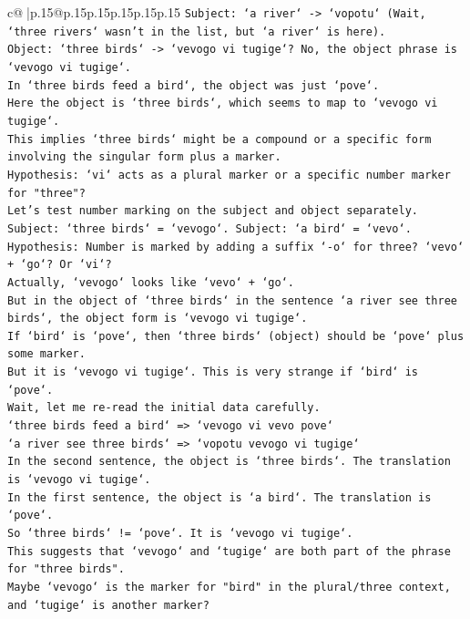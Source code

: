 \documentclass{article}
\begin{document}
{\begin{supertabular}{c@{$\;$}|p{.15\linewidth}@{}p{.15\linewidth}p{.15\linewidth}p{.15\linewidth}p{.15\linewidth}p{.15\linewidth}}
{{{\texttt{Subject: `a river` {-}> `vopotu` (Wait, `three rivers` wasn't in the list, but `a river` is here).} \\
\texttt{Object: `three birds` {-}> `vevogo vi tugige`? No, the object phrase is `vevogo vi tugige`.} \\
\texttt{In `three birds feed a bird`, the object was just `pove`.} \\
\texttt{Here the object is `three birds`, which seems to map to `vevogo vi tugige`.} \\
\texttt{This implies `three birds` might be a compound or a specific form involving the singular form plus a marker.} \\
\texttt{Hypothesis: `vi` acts as a plural marker or a specific number marker for "three"?} \\
\texttt{Let's test number marking on the subject and object separately.} \\
\texttt{Subject: `three birds` = `vevogo`. Subject: `a bird` = `vevo`.} \\
\texttt{Hypothesis: Number is marked by adding a suffix `{-}o` for three? `vevo` + `go`? Or `vi`?} \\
\texttt{Actually, `vevogo` looks like `vevo` + `go`.} \\
\texttt{But in the object of `three birds` in the sentence `a river see three birds`, the object form is `vevogo vi tugige`.} \\
\texttt{If `bird` is `pove`, then `three birds` (object) should be `pove` plus some marker.} \\
\texttt{But it is `vevogo vi tugige`. This is very strange if `bird` is `pove`.} \\
\texttt{Wait, let me re{-}read the initial data carefully.} \\
\texttt{`three birds feed a bird` => `vevogo vi vevo pove`} \\
\texttt{`a river see three birds` => `vopotu vevogo vi tugige`} \\
\texttt{In the second sentence, the object is `three birds`. The translation is `vevogo vi tugige`.} \\
\texttt{In the first sentence, the object is `a bird`. The translation is `pove`.} \\
\texttt{So `three birds` != `pove`. It is `vevogo vi tugige`.} \\
\texttt{This suggests that `vevogo` and `tugige` are both part of the phrase for "three birds".} \\
\texttt{Maybe `vevogo` is the marker for "bird" in the plural/three context, and `tugige` is another marker?} \\
}}}
\end{supertabular}}
\end{document}
